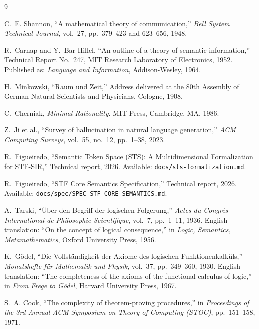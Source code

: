 \documentclass{article}
\newcommand{\STF}{{\normalfont\textsc{STF}}}
\newcommand{\SIR}{{\normalfont\textsc{SIR}}}
\newcommand{\STS}{{\normalfont\textsc{STS}}}
\begin{document}
\begin{thebibliography}{9}

  C.~E. Shannon,
  ``A mathematical theory of communication,''
  \textit{Bell System Technical Journal}, vol.~27, pp.~379--423 and 623--656,
  1948.

  R.~Carnap and Y.~Bar-Hillel,
  ``An outline of a theory of semantic information,''
  Technical Report No.~247, MIT Research Laboratory of Electronics, 1952.
  Published as: \textit{Language and Information}, Addison-Wesley, 1964.

  H.~Minkowski,
  ``Raum und Zeit,''
  Address delivered at the 80th Assembly of German Natural Scientists and
  Physicians, Cologne, 1908.

  C.~Cherniak,
  \textit{Minimal Rationality}.
  MIT Press, Cambridge, MA, 1986.

  Z.~Ji et al.,
  ``Survey of hallucination in natural language generation,''
  \textit{ACM Computing Surveys}, vol.~55, no.~12, pp.~1--38, 2023.

  R.~Figueiredo,
  ``Semantic Token Space (\STS{}): A Multidimensional Formalization for
  \STF{}-\SIR{},''
  Technical report, 2026.
  Available: \texttt{docs/sts-formalization.md}.

  R.~Figueiredo,
  ``\STF{} Core Semantics Specification,''
  Technical report, 2026.
  Available: \texttt{docs/spec/SPEC-STF-CORE-SEMANTICS.md}.

  A.~Tarski,
  ``\"{U}ber den Begriff der logischen Folgerung,''
  \textit{Actes du Congr\`{e}s International de Philosophie Scientifique},
  vol.~7, pp.~1--11, 1936.
  English translation: ``On the concept of logical consequence,''
  in \textit{Logic, Semantics, Metamathematics}, Oxford University Press, 1956.

  K.~G\"{o}del,
  ``Die Vollst\"{a}ndigkeit der Axiome des logischen Funktionenkalk\"{u}ls,''
  \textit{Monatshefte f\"{u}r Mathematik und Physik}, vol.~37, pp.~349--360,
  1930.
  English translation: ``The completeness of the axioms of the functional
  calculus of logic,'' in \textit{From Frege to G\"{o}del}, Harvard University
  Press, 1967.

  S.~A. Cook,
  ``The complexity of theorem-proving procedures,''
  in \textit{Proceedings of the 3rd Annual ACM Symposium on Theory of
  Computing (STOC)}, pp.~151--158, 1971.

\end{thebibliography}
\end{document}
